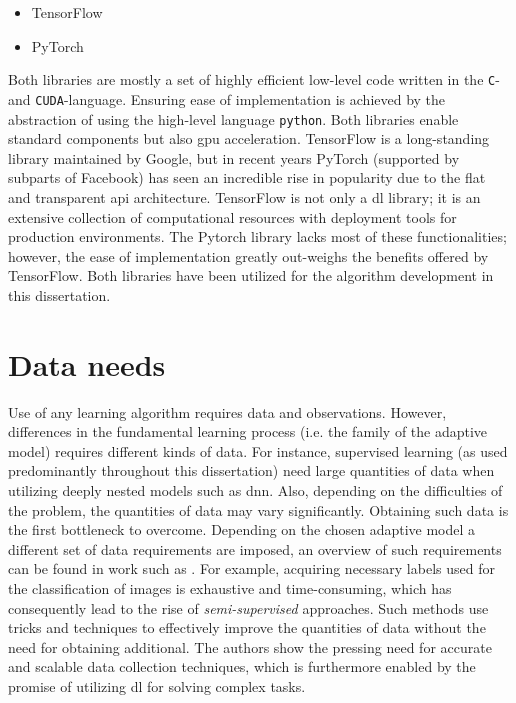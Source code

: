 \begin{itemize}
    \item TensorFlow \cite{tensorflow2015-whitepaper}
    \item PyTorch \cite{Paszke2017AutomaticPyTorch}
\end{itemize}

Both libraries are mostly a set of highly efficient low-level code written in the \texttt{C}- and \texttt{CUDA}-language. Ensuring ease of implementation is achieved by the abstraction of using the high-level language \texttt{python}. Both libraries enable standard components but also \gls{gpu} acceleration. TensorFlow is a long-standing library maintained by Google, but in recent years PyTorch (supported by subparts of Facebook) has seen an incredible rise in popularity due to the flat and transparent \gls{api} architecture. TensorFlow is not only a \gls{dl} library; it is an extensive collection of computational resources with deployment tools for production environments. The Pytorch library lacks most of these functionalities; however, the ease of implementation greatly out-weighs the benefits offered by TensorFlow. Both libraries have been utilized for the algorithm development in this dissertation. 

\section{Data needs}

Use of any learning algorithm requires data and observations. However, differences in the fundamental learning process (i.e. the family of the adaptive model) requires different kinds of data. For instance, supervised learning (as used predominantly throughout this dissertation) need large quantities of data when utilizing deeply nested models such as \gls{dnn}. Also, depending on the difficulties of the problem, the quantities of data may vary significantly. Obtaining such data is the first bottleneck to overcome. Depending on the chosen adaptive model a different set of data requirements are imposed, an overview of such requirements can be found in work such as \cite{RohAPerspective}. For example, acquiring necessary labels used for the classification of images is exhaustive and time-consuming, which has consequently lead to the rise of \emph{semi-supervised} approaches. Such methods use tricks and techniques to effectively improve the quantities of data without the need for obtaining additional. The authors show the pressing need for accurate and scalable data collection techniques, which is furthermore enabled by the promise of utilizing \gls{dl} for solving complex tasks. 

